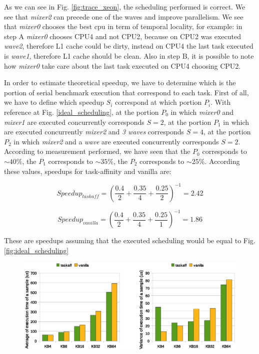 As we can see in Fig. \ref{fig:trace_xeon}, the scheduling performed is correct. We see that \textit{mixer2} can precede one of the waves and improve 
parallelism. We see that \textit{mixer0} chooses the best cpu in term of temporal locality, for example: in step A \textit{mixer0} chooses CPU4 and not 
CPU2, because on CPU2 was executed \textit{wave2}, therefore L1 cache could be dirty, instead on CPU4 the last task executed is \textit{wave1}, therefore 
L1 cache should be clean. Also in step B, it is possible to note how \textit{mixer0} take care about the last task executed on CPU4 choosing CPU2.

In order to estimate theoretical speedup, we have to determine which is the portion of serial benchmark execution that correspond to each task.
First of all, we have to define which speedup $S_{i}$ correspond at which portion $P_{i}$. With reference at Fig. \ref{ideal_scheduling}, at the portion 
$P_{0}$ in which \textit{mixer0} and \textit{mixer1} are executed concurrently corresponds $S = 2$, at the portion $P_{1}$ in which are executed 
concurrently \textit{mixer2} and \textit{3 waves} corresponds $S = 4$, at the portion $P_{2}$ in which \textit{mixer2} and a \textit{wave} are executed 
concurrently corresponds $S = 2$. According to measurement performed, we have seen that the $P_{0}$ corresponds to $\sim 40\%$, the $P_{1}$ corresponds to 
$\sim 35\%$, the $P_{2}$ corresponds to $\sim 25\%$. According these values, speedups for task-affinity and vanilla are:

\begin{equation}
  Speedup_{taskaff} = \left( \frac{0.4}{2} + \frac{0.35}{4} + \frac{0.25}{2} \right)^{-1} = 2.42
\label{eq:speedup_xeon_taskaff}
\end{equation}

\begin{equation}
  Speedup_{vanilla} = \left(\frac{0.4}{2} + \frac{0.35}{4} + \frac{0.25}{1} \right)^{-1} = 1.86
\label{eq:speedup_xeon_van}
\end{equation}


These are speedups assuming that the executed scheduling would be equal to Fig.  \ref{fig:ideal_scheduling}

\begin{figure}[htbp]
\centering
\includegraphics[width=\widefigure]{images/results_xeon/time_avg_var.eps}
\caption{}
\label{fig:time_avg_var_xeon}
\end{figure}


